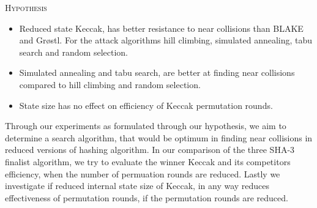 \begin{center}
  \framebox
  {
    \parbox{400pt}
    {
      \centering \textsc{Hypothesis} \\
      \begin{itemize}
      \item Reduced state Keccak, has better resistance to near collisions than BLAKE and Gr{\o}stl. For the
      attack algorithms hill climbing, simulated annealing, tabu search and random selection.
      \item Simulated annealing and tabu search, are better at finding near collisions compared to hill 
      climbing and random selection.
      \item State size has no effect on efficiency of Keccak permutation rounds.
      \end{itemize}
    }
  }
\end{center}

Through our experiments as formulated through our hypothesis, we aim to determine a search algorithm, that
would be optimum in finding near collisions in reduced versions of hashing algorithm. In our comparison of
the three SHA-3 finalist algorithm, we try to evaluate the winner Keccak and its competitors efficiency, when
the number of permuation rounds are reduced. Lastly we investigate if reduced internal state size of Keccak,
in any way reduces effectiveness of permutation rounds, if the permutation rounds are reduced.
